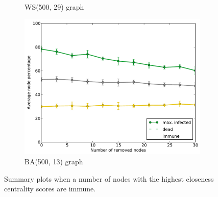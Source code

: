 \documentclass[11pt]{article} %
\begin{document}
\begin{figure}[tb]
\begin{subfigure}[b]{0.5\textwidth}
    \caption{WS(500, 29) graph}
  \end{subfigure}
  \begin{subfigure}[b]{0.5\textwidth}
    \centering
    \includegraphics[width=\textwidth]{figures/hubs_BA_500_13}
    \caption{BA(500, 13) graph}
  \end{subfigure}
  \caption{Summary plots when a number of nodes with the highest
    closeness centrality scores are immune.}
  \label{fig:ba_evo}
\end{figure}



\end{document}
